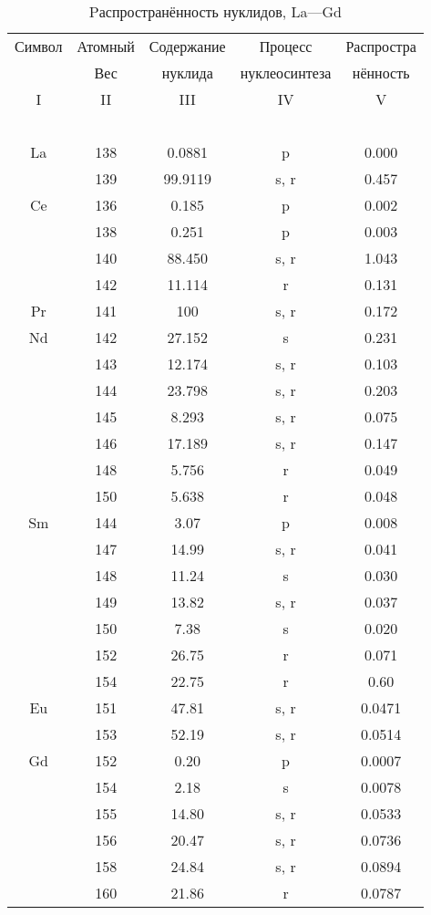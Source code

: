 \documentclass[a5paper,openany]{book}
\begin{document}
\begin{table}[h!]
	{\small
		\begin{tabular}{ccccc}
			Символ  & Атомный &  Содержание  & Процесс & Распростра   \\
			~ & Вес &  нуклида  &  нуклеосинтеза  & нённость  \\
			\hline 
			I & II &  III  & IV & V \\
			\hline 
			~ & ~ & ~ & ~ & ~  \\
			La & 138 & 0.0881 & p & 0.000 \\ [1mm]
			& 139 & 99.9119 & s, r & 0.457 \\ [1mm] 
			Ce & 136 & 0.185 & p & 0.002 \\ [1mm]
			& 138 & 0.251 & p & 0.003 \\ [1mm] 
			& 140 &  88.450 & s, r & 1.043 \\ [1mm]  			
			& 142 & 11.114 & r & 0.131 \\ [1mm]	
			Pr & 141 & 100 & s, r & 0.172 \\ [1mm]
			Nd & 142 & 27.152 & s & 0.231 \\ [1mm]
			& 143 & 12.174 & s, r & 0.103 \\ [1mm] 
			& 144 & 23.798 & s, r & 0.203 \\ [1mm]  			
			& 145 & 8.293 & s, r & 0.075 \\ [1mm]	
			& 146 & 17.189 & s, r & 0.147 \\ [1mm] 
			& 148 &  5.756 & r & 0.049 \\ [1mm]  			
			& 150 & 5.638 & r & 0.048 \\ [1mm]	
			Sm & 144 & 3.07 & p & 0.008 \\ [1mm]
			& 147 & 14.99 & s, r & 0.041 \\ [1mm] 
			& 148 &  11.24 & s & 0.030 \\ [1mm]  			
			& 149 & 13.82 & s, r & 0.037 \\ [1mm]	
			& 150 & 7.38 & s & 0.020 \\ [1mm] 
			& 152 &  26.75 & r & 0.071 \\ [1mm]  			
			& 154 & 22.75 & r & 0.60 \\ [1mm]	
			Eu & 151 & 47.81 & s, r & 0.0471 \\ [1mm]
			& 153 & 52.19 & s, r & 0.0514 \\ [1mm] 
			Gd & 152 & 0.20 & p & 0.0007 \\ [1mm]
			& 154 & 2.18 & s & 0.0078 \\ [1mm] 
			& 155 &  14.80 & s, r & 0.0533 \\ [1mm]  			
			& 156 & 20.47 & s, r & 0.0736 \\ [1mm]	
			& 158 & 24.84 & s, r & 0.0894 \\ [1mm] 
			& 160 &  21.86 & r & 0.0787 \\ [1mm]  			
			\hline 
		\end{tabular}
	}
	\caption{Pаспространённость нуклидов, La---Gd}
	\label{t:AbudanceSolarLaGd}
\end{table}
\end{document}

